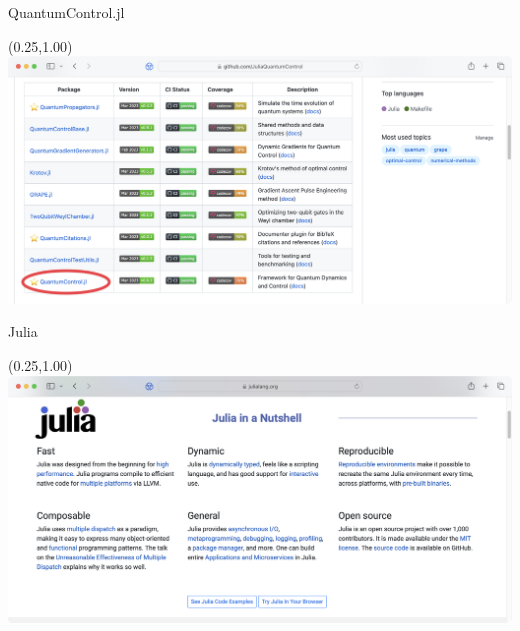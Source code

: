 \documentclass[compress, aspectratio=169]{beamer}
\begin{document}
\begin{frame}{QuantumControl.jl}
  \begin{textblock}{15.5}(0.25,1.00)
    \includegraphics[width=\textwidth]{images/01_02_packages_hlqc}
  \end{textblock}
\end{frame}


\begin{frame}{Julia}
  \begin{textblock}{15.5}(0.25,1.00)
    \includegraphics[width=\textwidth]{images/01_03_julia}
  \end{textblock}
\end{frame}


\begin{frame}
  \vfill
  \begin{center}
    \huge
  \end{center}
  \vfill
\end{frame}
\end{document}
